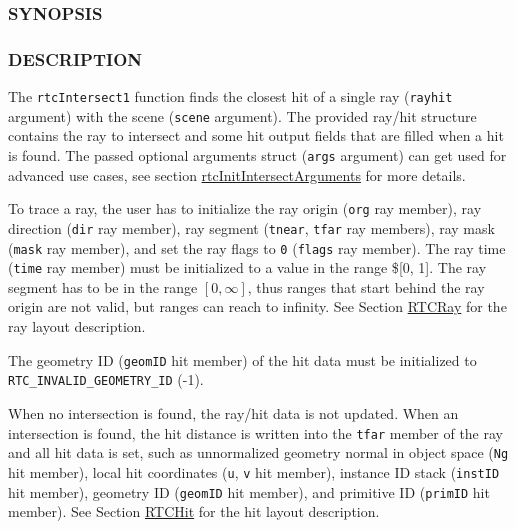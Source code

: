 \subsubsection{SYNOPSIS}\label{synopsis}

\begin{Shaded}
\begin{Highlighting}[]

\OperatorTok{(}
\OperatorTok{,}
  \OperatorTok{*}
  \OperatorTok{*}\OperatorTok{=}
\OperatorTok{);}
\end{Highlighting}
\end{Shaded}

\subsubsection{DESCRIPTION}\label{description}

The \texttt{rtcIntersect1} function finds the closest hit of a single
ray (\texttt{rayhit} argument) with the scene (\texttt{scene} argument).
The provided ray/hit structure contains the ray to intersect and some
hit output fields that are filled when a hit is found. The passed
optional arguments struct (\texttt{args} argument) can get used for
advanced use cases, see section
\hyperref[rtcinitintersectarguments]{rtcInitIntersectArguments} for more
details.

To trace a ray, the user has to initialize the ray origin (\texttt{org}
ray member), ray direction (\texttt{dir} ray member), ray segment
(\texttt{tnear}, \texttt{tfar} ray members), ray mask (\texttt{mask} ray
member), and set the ray flags to \texttt{0} (\texttt{flags} ray
member). The ray time (\texttt{time} ray member) must be initialized to
a value in the range \${[}0, 1{]}. The ray segment has to be in the
range \([0, \infty]\), thus ranges that start behind the ray origin are
not valid, but ranges can reach to infinity. See Section
\hyperref[rtcray]{RTCRay} for the ray layout description.

The geometry ID (\texttt{geomID} hit member) of the hit data must be
initialized to \texttt{RTC\_INVALID\_GEOMETRY\_ID} (-1).

When no intersection is found, the ray/hit data is not updated. When an
intersection is found, the hit distance is written into the
\texttt{tfar} member of the ray and all hit data is set, such as
unnormalized geometry normal in object space (\texttt{Ng} hit member),
local hit coordinates (\texttt{u}, \texttt{v} hit member), instance ID
stack (\texttt{instID} hit member), geometry ID (\texttt{geomID} hit
member), and primitive ID (\texttt{primID} hit member). See Section
\hyperref[rtchit]{RTCHit} for the hit layout description.

